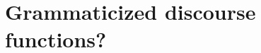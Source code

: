 \documentclass[output=paper,hidelinks]{langscibook}
\begin{document}





\section {Grammaticized discourse functions?}\label{discoursefunctions}
\end{document}
